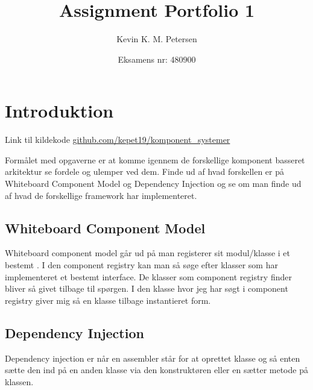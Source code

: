 \title{Assignment Portfolio 1}
\author{Kevin K. M. Petersen \and Eksamens nr: 480900}
\maketitle

\section{Introduktion}
Link til kildekode
\href{https://github.com/kepet19/komponent_systemer}{github.com/kepet19/komponent\_systemer}

Formålet med opgaverne er at komme igennem de forskellige komponent basseret
arkitektur se fordele og ulemper ved dem.
Finde ud af hvad forskellen er på Whiteboard Component Model og Dependency
Injection og se om man finde ud af hvad de forskellige framework har
implementeret.


\subsection{Whiteboard Component Model}
Whiteboard component model går ud på man registerer sit modul/klasse i et 
bestemt . I den component registry kan man så søge
efter klasser som har implementeret et bestemt interface. De klasser som component
registry finder bliver så givet tilbage til spørgen. I den klasse hvor jeg har
søgt i component registry giver mig så en klasse tilbage instantieret form.


\subsection{Dependency Injection}
Dependency injection er når en assembler står for at oprettet klasse og så
enten sætte den ind på en anden klasse via den konstruktøren eller en sætter
metode på klassen.
